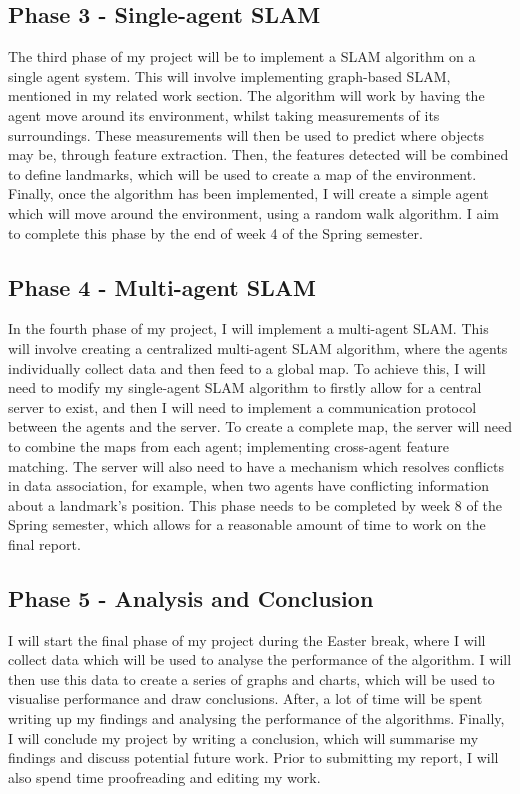 \documentclass[12pt]{article}
\begin{document}
\subsection{Phase 3 - Single-agent SLAM}
The third phase of my project will be to implement a SLAM algorithm on a single agent system. This will involve implementing
graph-based SLAM, mentioned in my related work section. The algorithm will work by having the agent move around its environment,
whilst taking measurements of its surroundings. These measurements will then be used to predict where objects may be, through
feature extraction. Then, the features detected will be combined to define landmarks, which will be used to create a map of
the environment. Finally, once the algorithm has been implemented, I will create a simple agent which will move around the
environment, using a random walk algorithm. I aim to complete this phase by the end of week 4 of the Spring semester.


\subsection{Phase 4 - Multi-agent SLAM}
In the fourth phase of my project, I will implement a multi-agent SLAM. This will involve creating a centralized multi-agent
SLAM algorithm, where the agents individually collect data and then feed to a global map. To achieve this, I will need to
modify my single-agent SLAM algorithm to firstly allow for a central server to exist, and then I will need to implement a
communication protocol between the agents and the server. To create a complete map, the server will need to combine the maps
from each agent; implementing cross-agent feature matching. The server will also need to have a mechanism which resolves conflicts
in data association, for example, when two agents have conflicting information about a landmark's position. This phase needs
to be completed by week 8 of the Spring semester, which allows for a reasonable amount of time to work on the final report.


\subsection{Phase 5 - Analysis and Conclusion}
I will start the final phase of my project during the Easter break, where I will collect data which will be used to analyse
the performance of the algorithm. I will then use this data to create a series of graphs and charts, which will be used to
visualise performance and draw conclusions. After, a lot of time will be spent writing up my findings and analysing the performance
of the algorithms. Finally, I will conclude my project by writing a conclusion, which will summarise my findings and discuss
potential future work. Prior to submitting my report, I will also spend time proofreading and editing my work.
\end{document}
